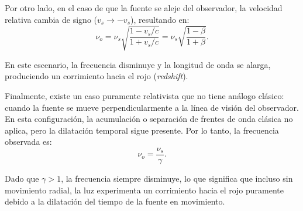 Por otro lado, en el caso de que la fuente se aleje del observador, la velocidad relativa cambia de signo ($v_s \to -v_s$), resultando en:
$$
\nu_o = \nu_s \sqrt{\frac{1 - v_s/c}{1 + v_s/c}} = \nu_s \sqrt{\frac{1 - \beta}{1 + \beta}}.
$$

En este escenario, la frecuencia disminuye y la longitud de onda se alarga, produciendo un corrimiento hacia el rojo (\emph{redshift}).

Finalmente, existe un caso puramente relativista que no tiene análogo clásico: cuando la fuente se mueve perpendicularmente a la línea de visión del observador. En esta configuración, la acumulación o separación de frentes de onda clásica no aplica, pero la dilatación temporal sigue presente. Por lo tanto, la frecuencia observada es:
$$
\nu_o = \frac{\nu_s}{\gamma}.
$$

Dado que $\gamma > 1$, la frecuencia siempre disminuye, lo que significa que incluso sin movimiento radial, la luz experimenta un corrimiento hacia el rojo puramente debido a la dilatación del tiempo de la fuente en movimiento.